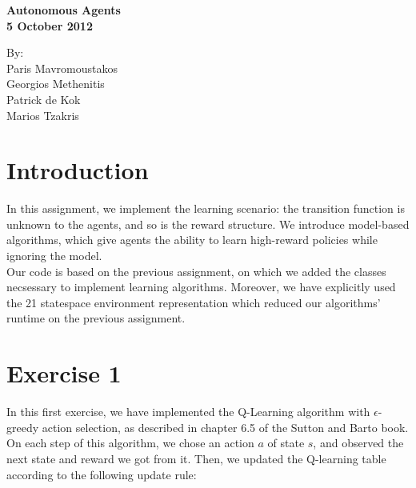 \documentclass[a4paper,11pt]{article}
\begin{document}
\begin{center}
{\LARGE \textbf{Autonomous Agents}}\\ [1em] \vspace{0.1cm}
\Large\textbf{5 October 2012 }\\ \vspace{0.1cm}
\Large{}
\end{center}


\begin{center}
{\Large By:} \\ \vspace{0.1cm}
{\Large Paris Mavromoustakos} \\  \vspace{0.1cm}
{\Large Georgios Methenitis} \\ \vspace{0.1cm}
{\Large Patrick de Kok} \\ \vspace{0.1cm}
{\Large Marios Tzakris}


\end{center}




\section*{Introduction}

In this assignment, we implement the learning scenario: the transition function is unknown to the agents, and so is the reward structure. We introduce model-based algorithms, which give agents the ability to learn high-reward policies while ignoring the model.  \\
Our code is based on the previous assignment, on which we added the classes necsessary to implement learning algorithms. Moreover, we have explicitly used the 21 statespace environment representation which reduced our algorithms' runtime on the previous assignment.


\section*{Exercise 1}

In this first exercise, we have implemented the Q-Learning algorithm with $\epsilon$-greedy action selection, as described  in chapter 6.5 of the Sutton and Barto book.\\
On each step of this algorithm, we chose an action $a$ of state $s$, and observed the next state and reward we got from it. Then, we updated the Q-learning table according to the following update rule: \\ 
\end{document}
